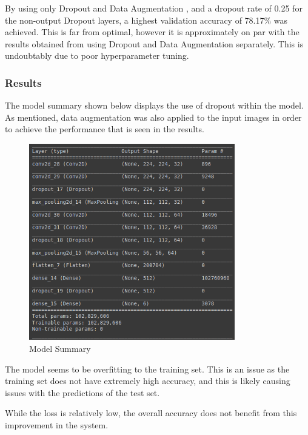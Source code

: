 By using only Dropout and Data Augmentation , and a dropout rate of 0.25 for
the non-output
Dropout layers, a highest validation accuracy of 78.17\% was achieved. This is
far from optimal, however it is approximately on par with the results obtained
from using Dropout and Data Augmentation separately. This is undoubtably due to
poor hyperparameter tuning.

\subsubsection{Results}

The model summary shown below displays the use of dropout within the model. As
mentioned, data augmentation was also applied to the input images in order to
achieve the performance that is seen in the results.

\begin{figure}[H]
	\centering
	\includegraphics[width=0.8\textwidth]{images/q1/pe/q1pemodel}
	\caption{Model Summary}
	\label{fig:q1pemodel}
\end{figure}

The model seems to be overfitting to the training set. This is an issue as the
training set does not have extremely high accuracy, and this is likely causing
issues with the predictions of the test set.

While the loss is relatively low, the overall accuracy does not benefit from
this improvement in the system.

